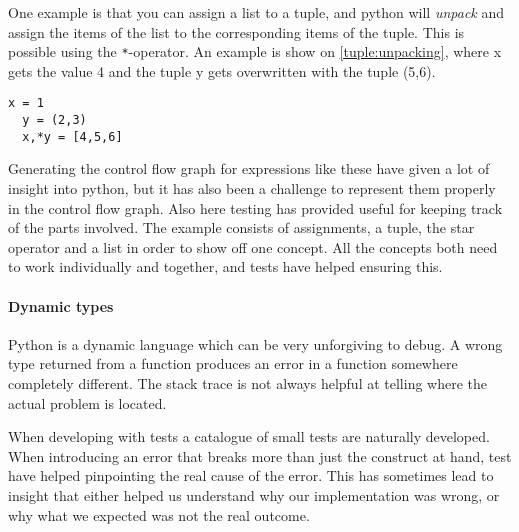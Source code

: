 One example is that you can assign a list to a tuple, and python will \emph{unpack} and assign the items of the list to the corresponding items of the tuple.
This is possible using the \texttt{*}-operator.
An example is show on \cref{tuple:unpacking}, where x gets the value 4 and the tuple y gets overwritten with the tuple (5,6).
\begin{lstlisting}[style=python, caption={Tuple unpacking}, label=tuple:unpacking]
  x = 1
  y = (2,3)
  x,*y = [4,5,6]
\end{lstlisting}

Generating the control flow graph for expressions like these have given a lot of insight into python, but it has also been a challenge to represent them properly in the control flow graph.
Also here testing has provided useful for keeping track of the parts involved.
The example consists of assignments, a tuple, the star operator and a list in order to show off one concept.
All the concepts both need to work individually and together, and tests have helped ensuring this.

\paragraph{Dynamic types}
Python is a dynamic language which can be very unforgiving to debug.
A wrong type returned from a function produces an error in a function somewhere completely different.
The stack trace is not always helpful at telling where the actual problem is located.

When developing with tests a catalogue of small tests are naturally developed.
When introducing an error that breaks more than just the construct at hand, test have helped pinpointing the real cause of the error.
This has sometimes lead to insight that either helped us understand why our implementation was wrong, or why what we expected was not the real outcome.
